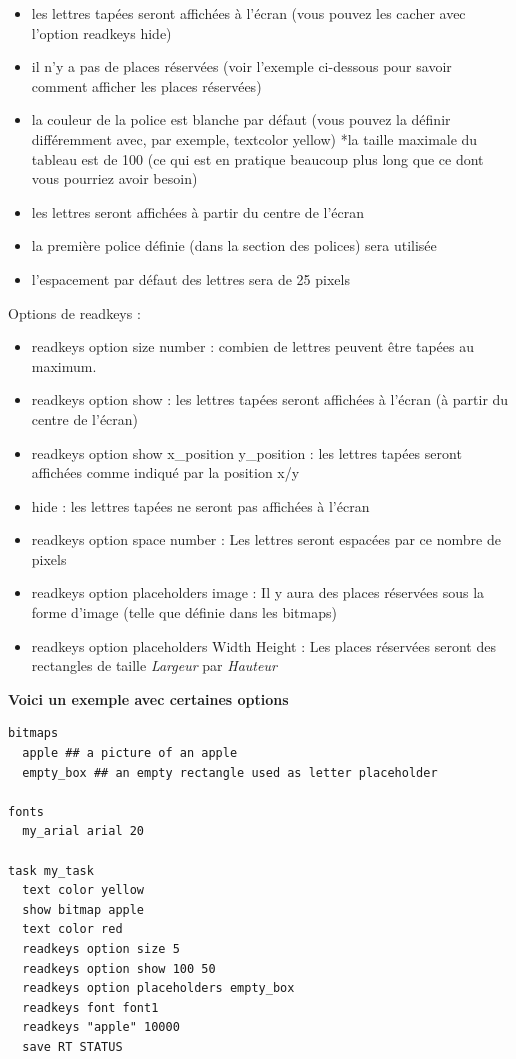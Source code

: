 \documentclass[
]{book}
\providecommand{\tightlist}{%
  \setlength{\itemsep}{0pt}\setlength{\parskip}{0pt}}
\begin{document}
\begin{itemize}
\tightlist
\item
  les lettres tapées seront affichées à l'écran (vous pouvez les cacher avec l'option readkeys hide)
\item
  il n'y a pas de places réservées (voir l'exemple ci-dessous pour savoir comment afficher les places réservées)
\item
  la couleur de la police est blanche par défaut (vous pouvez la définir différemment avec, par exemple, textcolor yellow)
  *la taille maximale du tableau est de 100 (ce qui est en pratique beaucoup plus long que ce dont vous pourriez avoir besoin)
\item
  les lettres seront affichées à partir du centre de l'écran
\item
  la première police définie (dans la section des polices) sera utilisée
\item
  l'espacement par défaut des lettres sera de 25 pixels
\end{itemize}

Options de readkeys :

\begin{itemize}
\tightlist
\item
  readkeys option size number : combien de lettres peuvent être tapées au maximum.
\item
  readkeys option show : les lettres tapées seront affichées à l'écran (à partir du centre de l'écran)
\item
  readkeys option show x\_position y\_position : les lettres tapées seront affichées comme indiqué par la position x/y
\item
  hide : les lettres tapées ne seront pas affichées à l'écran
\item
  readkeys option space number : Les lettres seront espacées par ce nombre de pixels
\item
  readkeys option placeholders image : Il y aura des places réservées sous la forme d'image (telle que définie dans les bitmaps)
\item
  readkeys option placeholders Width Height : Les places réservées seront des rectangles de taille \emph{Largeur} par \emph{Hauteur}
\end{itemize}

\textbf{Voici un exemple avec certaines options}

\begin{verbatim}
bitmaps
  apple ## a picture of an apple
  empty_box ## an empty rectangle used as letter placeholder

fonts
  my_arial arial 20

task my_task
  text color yellow
  show bitmap apple
  text color red
  readkeys option size 5
  readkeys option show 100 50
  readkeys option placeholders empty_box
  readkeys font font1
  readkeys "apple" 10000
  save RT STATUS
\end{verbatim}
\end{document}

